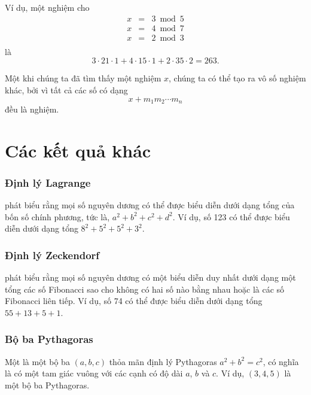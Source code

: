 Ví dụ, một nghiệm cho
\[
\begin{array}{lcl}
x & = & 3 \bmod 5 \\
x & = & 4 \bmod 7 \\
x & = & 2 \bmod 3 \\
\end{array}
\]
là
\[ 3 \cdot 21 \cdot 1 + 4 \cdot 15 \cdot 1 + 2 \cdot 35 \cdot 2 = 263.\]

Một khi chúng ta đã tìm thấy một nghiệm $x$,
chúng ta có thể tạo ra vô số nghiệm khác,
bởi vì tất cả các số có dạng
\[x+m_1 m_2 \cdots m_n\]
đều là nghiệm.

\section{Các kết quả khác}

\subsubsection{Định lý Lagrange}


phát biểu rằng mọi số nguyên dương
có thể được biểu diễn dưới dạng tổng của bốn số chính phương, tức là,
$a^2+b^2+c^2+d^2$.
Ví dụ, số 123 có thể được biểu diễn
dưới dạng tổng $8^2+5^2+5^2+3^2$.

\subsubsection{Định lý Zeckendorf}


phát biểu rằng mọi
số nguyên dương có một biểu diễn duy nhất
dưới dạng một tổng các số Fibonacci sao cho
không có hai số nào bằng nhau hoặc là
các số Fibonacci liên tiếp.
Ví dụ, số 74 có thể được biểu diễn
dưới dạng tổng $55+13+5+1$.

\subsubsection{Bộ ba Pythagoras}


Một  là một bộ ba $(a,b,c)$
thỏa mãn định lý Pythagoras
$a^2+b^2=c^2$, có nghĩa là có một tam giác vuông
với các cạnh có độ dài $a$, $b$ và $c$.
Ví dụ, $(3,4,5)$ là một bộ ba Pythagoras.

